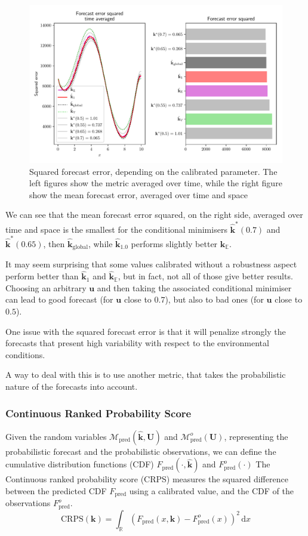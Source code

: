 \documentclass[preprint, 1p]{elsarticle}
\newcommand{\Ex}{\mathbb{E}}
\newcommand{\hatkmean}{\hat{\mathbf{k}}_{\Ex}}
\newcommand{\kest}{\hat{\mathbf{k}}}
\begin{document}
\begin{figure}[!h]
\centering
\includegraphics[width=.9\textwidth]{Figures/L2_full.pdf}
\caption{Squared forecast error, depending on the calibrated parameter. The left figures show the metric averaged over time, while the right figure show the mean forecast error, averaged over time and space}
\label{fig:forecast_squared_error}
\end{figure}
We can see that the mean forecast error squared, on the right side, averaged over time and space is the smallest for the conditional minimisers $\kest^*(0.7)$ and $\kest^*(0.65)$, then $\kest_{\mathrm{global}}$, while $\kest_{1.0}$ performs slightly better $\hatkmean$.

It may seem surprising that some values calibrated without a robustness aspect perform better than $\kest_1$ and $\hatkmean$, but in fact, not all of those give better results.
Choosing an arbitrary $\mathbf{u}$ and then taking the associated conditional minimiser can lead to good forecast (for $\mathbf{u}$ close to $0.7$), but also to bad ones (for $\mathbf{u}$ close to $0.5$).


One issue with the squared forecast error is that it will penalize strongly the forecasts that present high variability with respect to the environmental conditions.

A way to deal with this is to use another metric, that takes the probabilistic nature of the forecasts into account.

\subsubsection{Continuous Ranked Probability Score}
Given the random variables $\mathcal{M}_{\mathrm{pred}}(\kest, \mathbf{U})$ and $\mathcal{M}_{\mathrm{pred}}^o(\mathbf{U})$, representing the probabilistic forecast and the probabilistic observations, we can define the cumulative distribution functions (CDF) $F_{\mathrm{pred}}(\cdot, \kest)$ and $F^o_{\mathrm{pred}}(\cdot)$
The Continuous ranked probability score (CRPS) measures the squared difference between the predicted CDF $F_{\mathrm{pred}}$ using a calibrated value, and the CDF of the observations $F_{\mathrm{pred}}^o$. 
\begin{equation}
\label{eq:def_crps}
\mathrm{CRPS}(\mathbf{k}) = \int_{\mathbb{R}} (F_{\mathrm{pred}}(x,\mathbf{k}) - F^o_{\mathrm{pred}}(x))^2 \,\mathrm{d}x
\end{equation}
\end{document}
